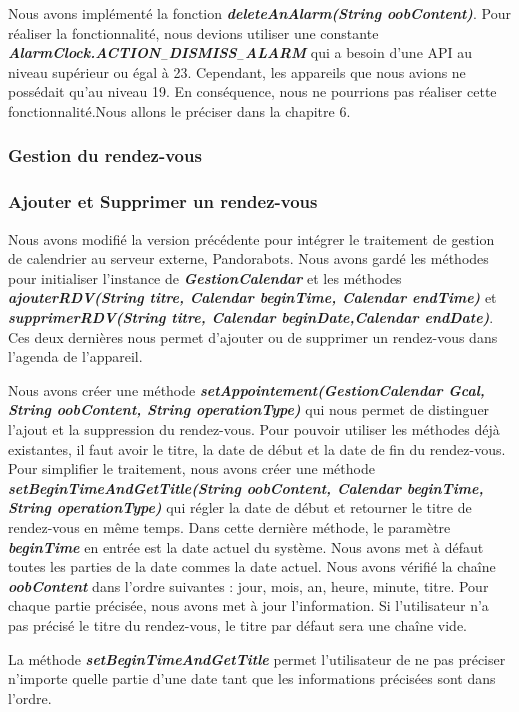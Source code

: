 \indent Nous avons implémenté la fonction \textbf{\emph{deleteAnAlarm(String oobContent)}}. Pour réaliser la fonctionnalité, nous devions utiliser une constante \textbf{\emph{AlarmClock.ACTION$_-$DISMISS$_-$ALARM}} qui a besoin d'une API au niveau supérieur ou égal à 23. Cependant, les appareils que nous avions ne possédait qu'au niveau 19. En conséquence, nous ne pourrions pas réaliser cette fonctionnalité.Nous allons le préciser dans la chapitre 6.

\subsubsection{Gestion du rendez-vous}
\subsubsection*{Ajouter et Supprimer un rendez-vous}

\indent Nous avons modifié la version précédente pour intégrer le traitement de gestion de calendrier au serveur externe, Pandorabots. Nous avons gardé les méthodes pour initialiser l'instance de \textbf{\emph{GestionCalendar}} et les méthodes \textbf{\emph{ajouterRDV(String titre, Calendar beginTime, Calendar endTime)}} et \textbf{\emph{supprimerRDV(String titre, Calendar beginDate,Calendar endDate)}}. Ces deux dernières nous permet d'ajouter ou de supprimer un rendez-vous dans l'agenda de l'appareil.

\indent Nous avons créer une méthode \textbf{\emph{setAppointement(GestionCalendar Gcal, String oobContent, String operationType)}} qui nous permet de distinguer l'ajout et la suppression du rendez-vous. Pour pouvoir utiliser les méthodes déjà existantes, il faut avoir le titre, la date de début et la date de fin du rendez-vous. Pour simplifier le traitement, nous avons créer une méthode \textbf{\emph{setBeginTimeAndGetTitle(String oobContent, Calendar beginTime, String operationType)}} qui régler la date de début et retourner le titre de rendez-vous en même temps. Dans cette dernière méthode, le paramètre \textbf{\emph{beginTime}} en entrée est la date actuel du système. Nous avons met à défaut toutes les parties de la date commes la date actuel. Nous avons vérifié la chaîne \textbf{\emph{oobContent}} dans l'ordre suivantes : jour, mois, an, heure, minute, titre. Pour chaque partie précisée, nous avons met à jour l'information. Si l'utilisateur n'a pas précisé le titre du rendez-vous, le titre par défaut sera une chaîne vide.

\indent La méthode \textbf{\emph{setBeginTimeAndGetTitle}} permet l'utilisateur de ne pas préciser n'importe quelle partie d'une date tant que les informations précisées sont dans l'ordre.

